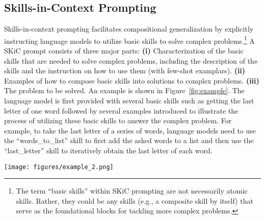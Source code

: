\documentclass{article} \usepackage{arxiv}
\begin{document}
\subsection{Skills-in-Context Prompting}
Skills-in-context prompting facilitates compositional generalization by explicitly instructing language models to utilize basic skills to solve complex problems.\footnote{The term ``basic skills'' within SKiC prompting are not necessarily atomic skills. Rather, they could be any skills (e.g., a composite skill by itself) that serve as the foundational blocks for tackling more complex problems.} A SKiC prompt consists of three major parts: \textbf{(i)} Characterization of the basic skills that are needed to solve complex problems, including the description of the skills and the instruction on how to use them (with few-shot examplars). \textbf{(ii)} Examples of how to compose basic skills into solutions to complex problems. \textbf{(iii)} The problem to be solved. An example is shown in Figure~\ref{fig:example}. The language model is first provided with several basic skills such as getting the last letter of one word followed by several examples introduced to illustrate the process of utilizing these basic skills to answer the complex problem. For example, to take the last letter of a series of words, language models need to use the ``words\_to\_list'' skill to first add the asked words to a list and then use the ``last\_letter'' skill to iteratively obtain the last letter of each word. 




\begin{figure*}[t]
\begin{center}
\centerline{\texttt{[image: figures/example\_2.png]}}
\caption{Skills-in-Context Prompting. The prompt consists of three building blocks: (i) the (basic) skills for solving a complex task, (ii) (few-shot) examples of how to compose the skills to solve the complex problems, and (iii) the problem to be solved. The few-shot demonstration examples for the skills are omitted above for brevity. The above prompt will be fed into an LLM to generate the output --- see Figure \ref{Tab:example_last_letter_skill} for an example of the output. Note that the compositional examplars demonstrate how to ground the reasoning steps onto the basic skills (highlighted in colors).} \label{fig:example}
\end{center}
\vskip -0.2in
\end{figure*}
\end{document}
